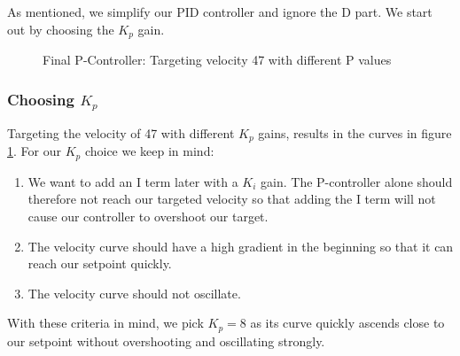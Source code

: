 As mentioned, we simplify our PID controller and ignore the D part. We start out by choosing the $K_p$ gain.

\begin{figure}[H]
    \centering
{}
    \caption{Final P-Controller: Targeting velocity 47 with different P values} \label{fig:P_final}
\end{figure}
\subsubsection*{Choosing $K_p$}
Targeting the velocity of 47 with different $K_p$ gains, results in the curves in figure \ref{fig:P_final}. 
For our $K_p$ choice we keep in mind:
\begin{enumerate}
    \item We want to add an I term later with a $K_i$ gain. The P-controller alone should therefore not reach our targeted velocity so that adding the I term will not cause our controller to overshoot our target.
    \item The velocity curve should have a high gradient in the beginning so that it can reach our setpoint quickly.
    \item The velocity curve should not oscillate.
\end{enumerate}
With these criteria in mind, we pick $K_p = 8$ as its curve quickly ascends close to our setpoint without overshooting and oscillating strongly.

